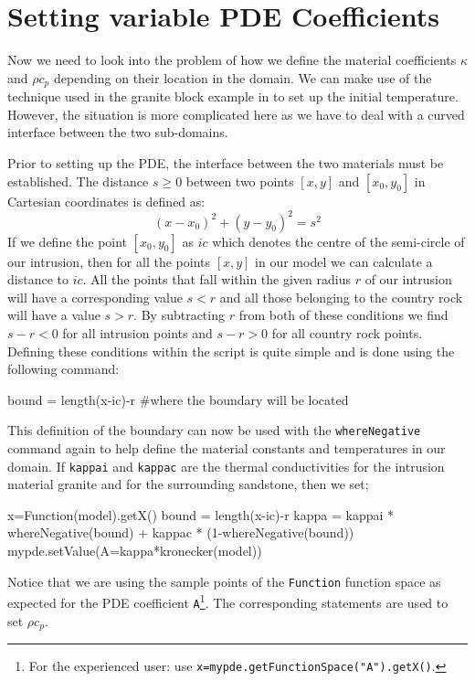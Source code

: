 \section{Setting variable PDE Coefficients}
Now we need to look into the problem of how we define the material coefficients
$\kappa$ and $\rho c_p$ depending on their location in the domain. 
We can make use of the technique used in the granite block example in
to set up the initial temperature. However,
the situation is more complicated here as we have to deal with a
curved interface between the two sub-domains.

Prior to setting up the PDE, the interface between the two materials must be
established. 
The distance $s\ge 0$ between two points $[x,y]$ and
$[x_{0},y_{0}]$ in Cartesian coordinates is defined as:
\begin{equation}
 (x-x_{0})^{2}+(y-y_{0})^{2} = s^{2}
\end{equation}
If we define the point $[x_{0},y_{0}]$ as $ic$ which denotes
the centre of the semi-circle of our intrusion, then for all the points $[x,y]$
in our model we can calculate a distance to $ic$. 
All the points that fall within the given radius $r$ of our intrusion will have
a corresponding 
value $s < r$ and all those belonging to the country rock will have a value $s >
r$. By subtracting $r$ from both of these conditions we find $s-r < 0$ for all
intrusion points and $s-r > 0$ for all country rock points. 
Defining these conditions within the script is quite simple and is done using
the following command:
\begin{python}
bound = length(x-ic)-r #where the boundary will be located
\end{python}
This definition of the boundary can now be used with the \verb|whereNegative|
command again to help define the material constants and temperatures in our
domain. 
If \verb|kappai| and \verb|kappac| are the 
thermal conductivities for the intrusion material granite and for the
surrounding sandstone, then we set; 
\begin{python}
x=Function(model).getX()
bound = length(x-ic)-r
kappa = kappai * whereNegative(bound) + kappac * (1-whereNegative(bound))
mypde.setValue(A=kappa*kronecker(model))
\end{python}
Notice that we are using the sample points of the \verb|Function| function space
as expected for the PDE coefficient \verb|A|\footnote{For the experienced user: use
\texttt{x=mypde.getFunctionSpace("A").getX()}.}.
The corresponding statements are used to set $\rho c_p$. 


